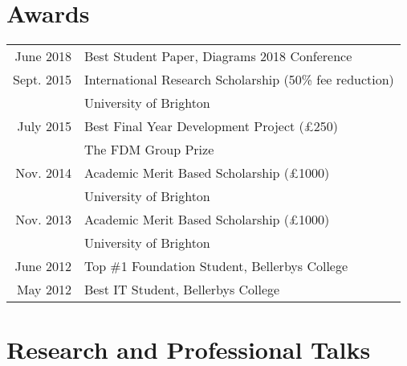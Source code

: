 \documentclass[a4paper,11pt]{article} %
\begin{document}
\section{Awards}

\begin{tabular}{rl}

June 2018 & Best Student Paper, Diagrams 2018 Conference\\

Sept. 2015 & International Research Scholarship (50\% fee reduction)\\ &University of Brighton\\

July 2015 & Best Final Year Development Project (£250)\\ &The FDM Group Prize \\

Nov. 2014 & Academic Merit Based Scholarship (£1000)\\ &University of Brighton \\

Nov. 2013 & Academic Merit Based Scholarship (£1000)\\ &University of Brighton \\

June 2012 & Top \#1 Foundation Student, Bellerbys College \\

May 2012 & Best IT Student, Bellerbys College \\

\end{tabular}


\section{Research and Professional Talks}
\end{document}
